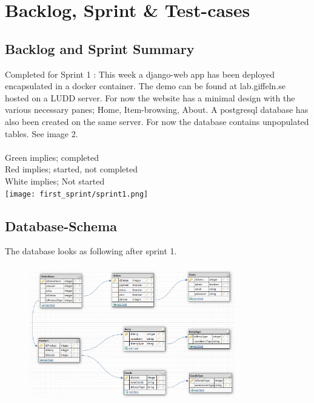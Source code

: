 \newpage
\section{Backlog, Sprint \& Test-cases}

\subsection{Backlog and Sprint Summary}
Completed for Sprint 1 :
This week a django-web app has been deployed encapsulated in a docker container. The demo can be found at lab.giffeln.se hosted on a LUDD server. For now the website has a minimal design with the various necessary panes; Home, Item-browsing, About. A postgresql database has also been created on the same server. For now the database contains unpopulated tables. See image 2. 
\\
\\
Green implies; completed
\\
Red implies; started, not completed 
\\  
White implies; Not started
\\
\texttt{[image: first\_sprint/sprint1.png]}

\newpage
\subsection{Database-Schema}
The database looks as following after sprint 1.
\begin{figure}[H]
    \center
    \includegraphics[height=6cm, width=9cm]{first_sprint/db_schema.png}
\end{figure} 

